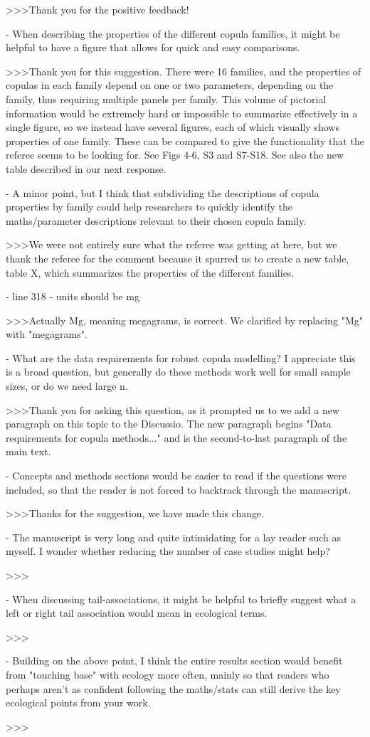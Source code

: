 >>>Thank you for the positive feedback!

- When describing the properties of the different copula families, it might be helpful to have a 
figure that allows for quick and easy comparisons.

>>>Thank you for this suggestion. There were 16 families, and the properties 
of copulas in each family depend on one or two parameters, depending on the 
family, thus requiring multiple panels per family. This volume of pictorial 
information would be extremely hard or impossible to summarize effectively in a 
single figure, so we instead have several figures, each of which visually 
shows properties of one family. These can be compared to give the functionality that 
the referee seems to be looking for. See Figs 4-6, S3 and S7-S18. See also the new
table described in our next response.

- A minor point, but I think that subdividing the descriptions of copula properties by family could 
help researchers to quickly identify the maths/parameter descriptions relevant to their chosen copula 
family.

>>>We were not entirely sure what the referee was getting at here, but we
thank the referee for the comment because it spurred us to create a new table, 
table X, which summarizes the properties of the different families.

- line 318 - units should be mg

>>>Actually Mg, meaning megagrams, is correct. We clarified by replacing "Mg" 
with "megagrams".

- What are the data requirements for robust copula modelling? I appreciate this 
is a broad question, but generally do these methods work well for small sample 
sizes, or do we need large n.

>>>Thank you for asking this question, as it prompted us to we add a new paragraph
on this topic to the Discussio. The new paragraph begins "Data requirements for 
copula methods..." and is the second-to-last paragraph of the main text.

- Concepts and methods sections would be easier to read if the questions were 
included, so that the reader is not forced to backtrack through the manuscript.

>>>Thanks for the suggestion, we have made this change.

- The manuscript is very long and quite intimidating for a lay reader such as myself. I wonder whether reducing the number of case studies might help?

>>>

- When discussing tail-associations, it might be helpful to briefly suggest what a left or right tail association would mean in ecological terms.

>>>

- Building on the above point, I think the entire results section would benefit from "touching base" with ecology more often, mainly so that readers who perhaps aren't as confident following the maths/stats can still derive the key ecological points from your work.

>>>

